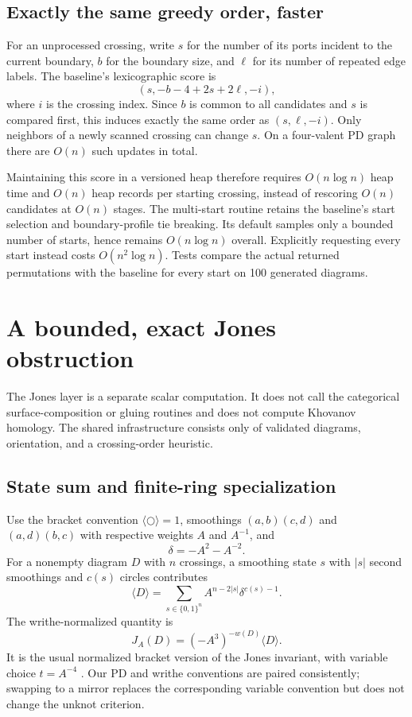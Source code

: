 \documentclass[11pt]{article}
\theoremstyle{definition}\newtheorem{definition}[theorem]{Definition}
\theoremstyle{remark}\newtheorem{remark}[theorem]{Remark}
\begin{document}
\subsection{Exactly the same greedy order, faster}

For an unprocessed crossing, write $s$ for the number of its ports incident
to the current boundary, $b$ for the boundary size, and $\ell$ for its number
of repeated edge labels. The baseline's lexicographic score is
\[
 (s,-b-4+2s+2\ell,-i),
\]
where $i$ is the crossing index. Since $b$ is common to all candidates and $s$
is compared first, this induces exactly the same order as $(s,\ell,-i)$.
Only neighbors of a newly scanned crossing can change $s$. On a four-valent
PD graph there are $O(n)$ such updates in total.

Maintaining this score in a versioned heap therefore requires
$O(n\log n)$ heap time and $O(n)$ heap records per starting crossing, instead
of rescoring $O(n)$ candidates at $O(n)$ stages. The multi-start routine
retains the baseline's start selection and boundary-profile tie breaking.
Its default samples only a bounded number of starts, hence remains
$O(n\log n)$ overall. Explicitly requesting every start instead costs
$O(n^2\log n)$. Tests compare the actual returned permutations with the
baseline for every start on 100 generated diagrams.

\section{A bounded, exact Jones obstruction}
\label{sec:jones}

The Jones layer is a separate scalar computation. It does not call the
categorical surface-composition or gluing routines and does not compute
Khovanov homology. The shared infrastructure consists only of validated
diagrams, orientation, and a crossing-order heuristic.

\subsection{State sum and finite-ring specialization}

Use the bracket convention $\langle\bigcirc\rangle=1$, smoothings
$(a,b)(c,d)$ and $(a,d)(b,c)$ with respective weights $A$ and $A^{-1}$, and
\[
 \delta=-A^2-A^{-2}.
\]
For a nonempty diagram $D$ with $n$ crossings, a smoothing state $s$ with
$|s|$ second smoothings and $c(s)$ circles contributes
\begin{equation}\label{eq:bracket}
 \langle D\rangle=
 \sum_{s\in\{0,1\}^n}A^{n-2|s|}\delta^{c(s)-1}.
\end{equation}
The writhe-normalized quantity is
\begin{equation}\label{eq:jones}
 J_A(D)=(-A^3)^{-w(D)}\langle D\rangle.
\end{equation}
It is the usual normalized bracket version of the Jones invariant, with
variable choice $t=A^{-4}$ \cite{Kauffman}. Our PD and writhe conventions
are paired consistently; swapping to a mirror replaces the corresponding
variable convention but does not change the unknot criterion.
\end{document}
